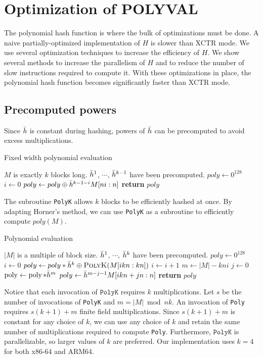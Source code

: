 \documentclass[hctr.tex]{subfiles}
\begin{document}
\section{Optimization of POLYVAL}\label{polyvalimpl}
The polynomial hash function is where the bulk of optimizations must be done. A naive partially-optimized implementation of $H$ is slower than XCTR mode. We use several optimization techniques to increase the efficiency of $H$. We show several methods to increase the parallelism of $H$ and to reduce the number of slow instructions required to compute it. With these optimizations in place, the polynomial hash function becomes significantly faster than XCTR mode.

\subsection{Precomputed powers}
Since $\bar{h}$ is constant during hashing, powers of $\bar{h}$ can be precomputed to avoid excess multiplications. 
\begin{algorithm}[H]
\caption{Fixed width polynomial evaluation}\label{polykalg}
\begin{algorithmic}[1]
	\Require $M$ is exactly $k$ blocks long.
	\Require $\bar{h}^1$, $\cdots$, $\bar{h}^{k-1}$ have been precomputed.
		\State $poly \gets 0^{128}$
		\State $i \gets 0$
		\State $poly \gets poly \oplus \bar{h}^{k-1-i}M[ni:n]$
		\EndFor
		\State \textbf{return} $poly$
	\EndProcedure
\end{algorithmic}
\end{algorithm}
The subroutine \texttt{PolyK} allows $k$ blocks to be efficiently hashed at once. By adapting Horner's method, we can use \texttt{PolyK} as a subroutine to efficiently compute $poly(M)$.

\begin{algorithm}[H]
\caption{Polynomial evaluation}\label{polyalg}
\begin{algorithmic}[1]
	\Require $|M|$ is a multiple of block size.
	\Require $\bar{h}^1$, $\cdots$, $\bar{h}^{k}$ have been precomputed.
		\State $poly \gets 0^{128}$
		\State $i \gets 0$
			\State $poly \gets poly*\hgen^k \oplus \Call{PolyK}{M[ikn : kn]}$
			\State $i \gets i + 1$
		\EndWhile
		\State $m \gets |M| - kni$
		\State $j \gets 0$
		\State $\operatorname{poly} \gets \operatorname{poly}*\bar{h}^m$
		\State $poly \gets \bar{h}^{m-j-1}M[ikn + jn : n]$
		\EndWhile
		\State \textbf{return} $poly$
	\EndProcedure
\end{algorithmic}
\end{algorithm}
Notice that each invocation of $\texttt{PolyK}$ requires $k$ multiplications. Let $s$ be the number of invocations of \texttt{PolyK} and $m = |M| \bmod nk$. An invocation of \texttt{Poly} requires $s(k+1) + m$ finite field multiplications. Since $s(k+1) + m$ is constant for any choice of $k$, we can use any choice of $k$ and retain the same number of multiplications required to compute \texttt{Poly}. Furthermore, $\texttt{PolyK}$ is parallelizable, so larger values of $k$ are preferred. Our implementation uses $k = 4$ for both x86-64 and ARM64.
\end{document}
